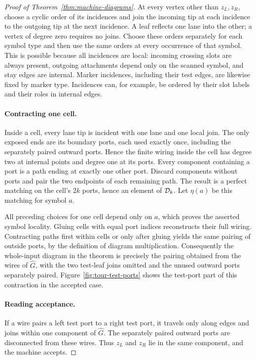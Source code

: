 \begin{proof}[Proof of Theorem~\ref{thm:machine-diagrams}]
At every vertex other than $z_L,z_R$, choose a cyclic order of
its incidences and join the incoming tip at each incidence to the
outgoing tip at the next incidence.  A leaf reflects one lane into
the other; a vertex of degree zero requires no joins.  Choose these
orders separately for each symbol type and then use the same orders
at every occurrence of that symbol.  This is possible because all
incidences are local: incoming crossing slots are always present,
outgoing attachments depend only on the scanned symbol, and stay
edges are internal.  Marker incidences, including their test edges,
are likewise fixed by marker type.  Incidences can, for example,
be ordered by their slot labels and their roles in internal edges.

\paragraph{Contracting one cell.}
Inside a cell, every lane tip is incident with one lane and one
local join.  The only exposed ends are its boundary ports, each
used exactly once, including the separately paired outward ports.
Hence the finite wiring inside the cell has degree two at internal
points and degree one at its ports.  Every component containing a
port is a path ending at exactly one other port.  Discard components
without ports and pair the two endpoints of each remaining path.
The result is a perfect matching on the cell's $2k$ ports, hence
an element of $\mathcal D_{k}$.  Let $\eta(a)$ be this matching for symbol
$a$.

All preceding choices for one cell depend only on $a$, which proves
the asserted symbol locality.  Gluing cells with equal port indices
reconstructs their full wiring.  Contracting paths first within
cells or only after gluing yields the same pairing of outside
ports, by the definition of diagram multiplication.  Consequently
the whole-input diagram in the theorem is precisely the pairing
obtained from the wires of $\widehat G$, with the two test-leaf
joins omitted and the unused outward ports separately paired.
Figure~\ref{fig:tour-test-ports} shows the test-port part of this
contraction in the accepted case.


\paragraph{Reading acceptance.}
If a wire pairs a left test port to a right test port, it travels
only along edges and joins within one component of $\widehat G$.
The separately paired outward ports are disconnected from these
wires.  Thus $z_L$ and $z_R$ lie in the same component, and the
machine accepts.


\end{proof}
